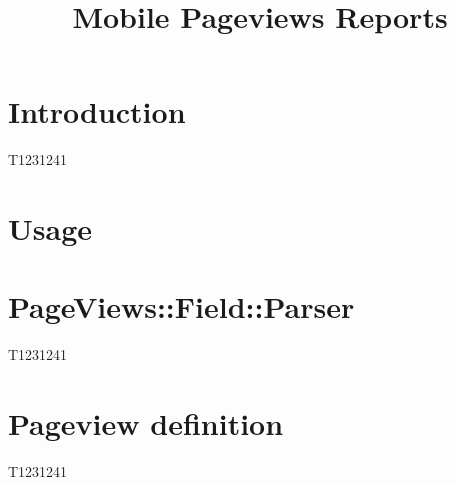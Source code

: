 \documentclass[a4paper]{article}
\begin{document}
\title{Mobile Pageviews Reports}
\date{}
\maketitle
\section{Introduction}
T1231241
\section{Usage}

\section{ \textbf{PageViews::Field::Parser}}
T1231241
\section{Pageview definition}
T1231241
\end{document}
